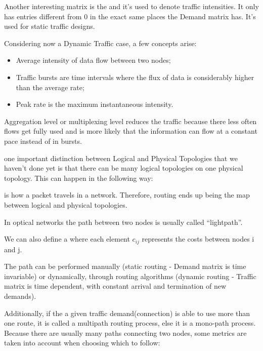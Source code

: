 Another interesting matrix is the  and it's used to denote traffic intensities. It only has entries different from 0 in the exact same places the Demand matrix has. It's used for static traffic designs.



Considering now a Dynamic Traffic case, a few concepts arise:
\begin{itemize}
    \item Average intensity of data flow between two nodes;
    \item Traffic bursts are time intervals where the flux of data is considerably higher than the average rate;
    \item Peak rate is the maximum instantaneous intensity.
\end{itemize}

Aggregation level or multiplexing level reduces the traffic  because there less often flows get fully used and is more likely that the information can flow at a constant pace instead of in bursts.


 one important distinction between Logical and Physical Topologies that we haven't done yet is that there can be many logical topologies on one physical topology. This can happen in the following way: 





 is how a packet travels in a network. Therefore, routing ends up being the map between logical and physical topologies. 

In optical networks the path between two nodes is usually called ``lightpath''.

We can also define a  where each element $c_{ij}$ represents the costs between nodes i and j.

The path can be performed manually (static routing - Demand matrix is time invariable) or dynamically, through routing algorithms (dynamic routing - Traffic matrix is time dependent, with constant arrival and termination of new demands).

Additionally, if the a given traffic demand(connection) is able to use more than one route, it is called a multipath routing process, else it is a mono-path process. Because there are usually many paths connecting two nodes, some metrics are taken into account when choosing which to follow:



